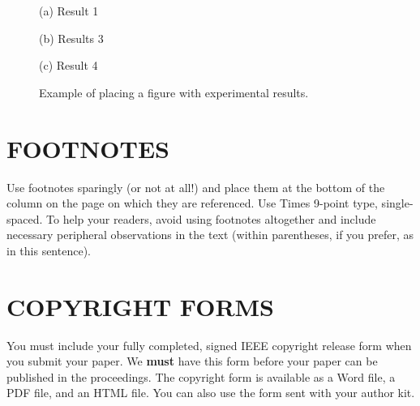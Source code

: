 \documentclass{article}
\begin{document}
\begin{figure}[htb]

\begin{minipage}[b]{1.0\linewidth}
  \centering
  \vspace{2.0cm}
  \centerline{(a) Result 1}\medskip
\end{minipage}
%
\begin{minipage}[b]{.48\linewidth}
  \centering
  \vspace{1.5cm}
  \centerline{(b) Results 3}\medskip
\end{minipage}
\hfill
\begin{minipage}[b]{0.48\linewidth}
  \centering
  \vspace{1.5cm}
  \centerline{(c) Result 4}\medskip
\end{minipage}
%
\caption{Example of placing a figure with experimental results.}
\label{fig:res}
%
\end{figure}

\vfill
\pagebreak


\section{FOOTNOTES}
\label{sec:foot}

Use footnotes sparingly (or not at all!) and place them at the bottom of the
column on the page on which they are referenced. Use Times 9-point type,
single-spaced. To help your readers, avoid using footnotes altogether and
include necessary peripheral observations in the text (within parentheses, if
you prefer, as in this sentence).


\section{COPYRIGHT FORMS}
\label{sec:copyright}

You must include your fully completed, signed IEEE copyright release form when
you submit your paper. We {\bf must} have this form before your paper can be
published in the proceedings.  The copyright form is available as a Word file,
a PDF file, and an HTML file. You can also use the form sent with your author
kit.
\end{document}
